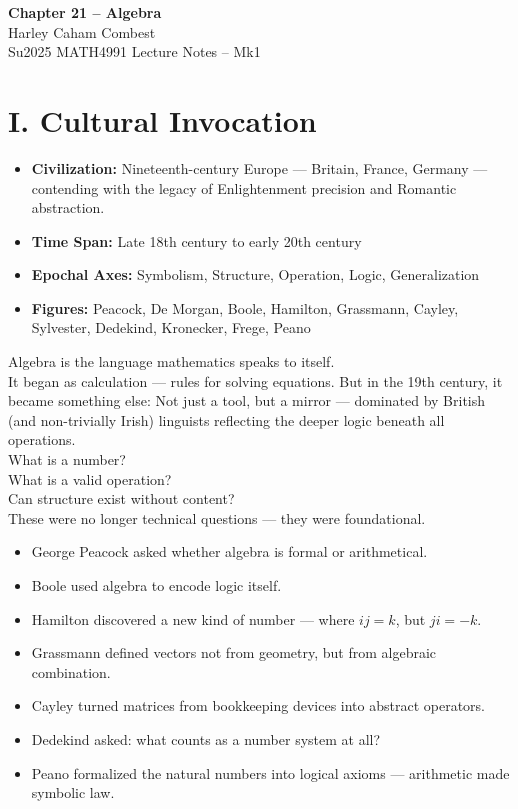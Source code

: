 \documentclass[9pt]{article}
\begin{document}
\begin{center}
\Large\textbf{Chapter 21 – Algebra} \\
\large Harley Caham Combest \\
\large Su2025 MATH4991 Lecture Notes – Mk1
\end{center}

\vspace{1em}

\section*{I. Cultural Invocation}

\begin{itemize}
  \item \textbf{Civilization:} Nineteenth-century Europe — Britain, France, Germany — contending with the legacy of Enlightenment precision and Romantic abstraction.
  \item \textbf{Time Span:} Late 18th century to early 20th century
  \item \textbf{Epochal Axes:} Symbolism, Structure, Operation, Logic, Generalization
  \item \textbf{Figures:} Peacock, De Morgan, Boole, Hamilton, Grassmann, Cayley, Sylvester, Dedekind, Kronecker, Frege, Peano
\end{itemize}

Algebra is the language mathematics speaks to itself.\\

\noindent
It began as calculation — rules for solving equations.  
But in the 19th century, it became something else:  
Not just a tool, but a mirror — dominated by British (and non-trivially Irish) linguists reflecting the deeper logic beneath all operations.\\

\noindent
What is a number?  \\
What is a valid operation?  \\
Can structure exist without content?\\

These were no longer technical questions — they were foundational.\\

\begin{itemize}
  \item George Peacock asked whether algebra is formal or arithmetical.
  \item Boole used algebra to encode logic itself.
  \item Hamilton discovered a new kind of number — where $ij = k$, but $ji = -k$.
  \item Grassmann defined vectors not from geometry, but from algebraic combination.
  \item Cayley turned matrices from bookkeeping devices into abstract operators.
  \item Dedekind asked: what counts as a number system at all?
  \item Peano formalized the natural numbers into logical axioms — arithmetic made symbolic law.
\end{itemize}
\end{document}
